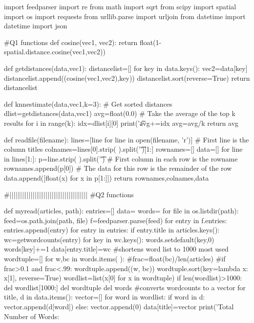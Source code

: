 \documentclass[12pt, letterpaper]{article}
\begin{document}
\begin{MyPython}[caption={ten\textunderscore dimension.py}, label=lst:tendimension]
import feedparser
import re
from math import sqrt
from scipy import spatial
import os
import requests
from urllib.parse import urljoin
from datetime import datetime
import json

#Q1 functions
def cosine(vec1, vec2):
    return float(1-spatial.distance.cosine(vec1,vec2))
    


def getdistances(data,vec1):
    distancelist=[]
    for key in data.keys():
        vec2=data[key]
        distancelist.append((cosine(vec1,vec2),key))
    distancelist.sort(reverse=True)
    return distancelist

def knnestimate(data,vec1,k=3):
    # Get sorted distances
    dlist=getdistances(data,vec1)
    avg=float(0.0)
    # Take the average of the top k results
    for i in range(k):
        idx=dlist[i][0]
        print('\t%
        avg+=idx
    avg=avg/k
    return avg


def readfile(filename):
    lines=[line for line in open(filename, 'r')]
    # First line is the column titles
    colnames=lines[0].strip( ).split('\t')[1:]
    rownames=[]
    data=[]
    for line in lines[1:]:
        p=line.strip( ).split('\t')
        # First column in each row is the rowname
        rownames.append(p[0])
        # The data for this row is the remainder of the row
        data.append([float(x) for x in p[1:]])
    return rownames,colnames,data

#|||||||||||||||||||||||||||||||||||||||||
#Q2 functions


def myread(articles, path):
    entries=[]
    data={}
    words={}
    for file in os.listdir(path):
        feed=os.path.join(path, file)
        f=feedparser.parse(feed)
        for entry in f.entries:
            entries.append(entry)
    for entry in entries:
        if entry.title in articles.keys():
            wc=getwordcounts(entry)
            for key in wc.keys():
                words.setdefault(key,0)
                words[key]+=1
            data[entry.title]=wc
    #shortens word list to 1000 most used        
    wordtuple=[]
    for w,bc in words.items( ):
        #frac=float(bc)/len(articles)
        #if frac>0.1 and frac<.99:
        wordtuple.append((w, bc))
    wordtuple.sort(key=lambda x: x[1], reverse=True)
    wordlist=list(x[0] for x in wordtuple)
    if len(wordlist)>1000:
        del wordlist[1000:]
    del wordtuple
    del words
    #converts wordcounts to a vector
    for title, d in data.items():
        vector=[]
        for word in wordlist:
            if word in d:
                vector.append(d[word])
            else: vector.append(0)
        data[title]=vector
    print('Total Number of Words: %
            

\end{MyPython}
\end{document}
